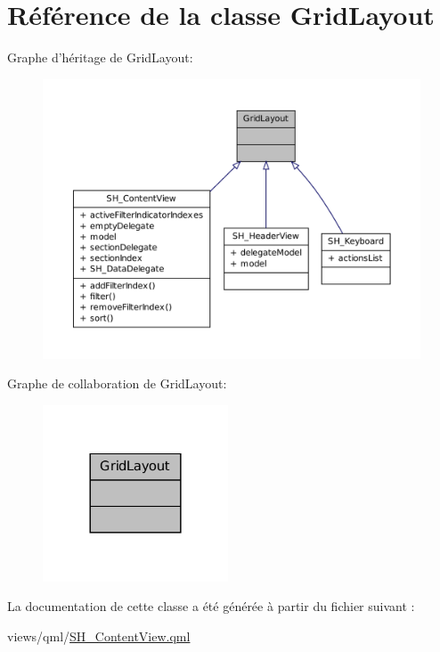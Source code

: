 \hypertarget{classGridLayout}{\section{Référence de la classe Grid\-Layout}
\label{classGridLayout}
}


Graphe d'héritage de Grid\-Layout\-:
\nopagebreak
\begin{figure}[H]
\begin{center}
\leavevmode
\includegraphics[width=350pt]{classGridLayout__inherit__graph}
\end{center}
\end{figure}


Graphe de collaboration de Grid\-Layout\-:
\nopagebreak
\begin{figure}[H]
\begin{center}
\leavevmode
\includegraphics[width=156pt]{classGridLayout__coll__graph}
\end{center}
\end{figure}


La documentation de cette classe a été générée à partir du fichier suivant \-:\begin{DoxyCompactItemize}
\item 
views/qml/\hyperlink{SH__ContentView_8qml}{S\-H\-\_\-\-Content\-View.\-qml}\end{DoxyCompactItemize}
